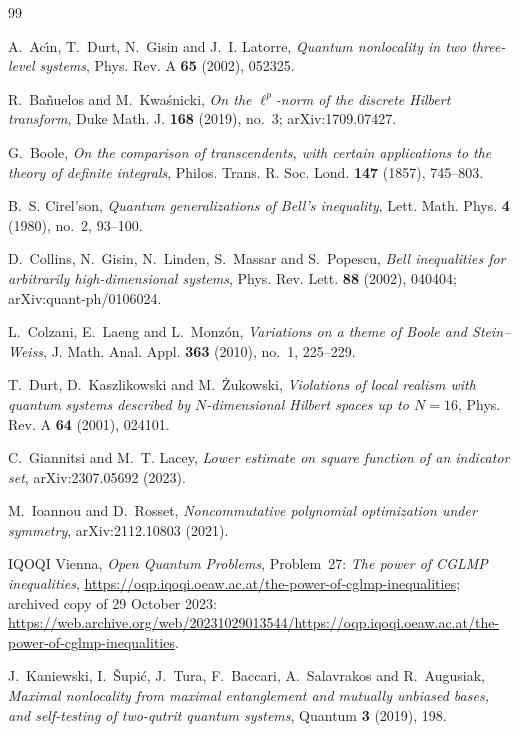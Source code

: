 \documentclass[11pt]{amsart}
\theoremstyle{definition}
\theoremstyle{remark}
\begin{document}
\begin{thebibliography}{99}

A.~Ac\'{\i}n, T.~Durt, N.~Gisin and J.~I. Latorre, \emph{Quantum nonlocality in two three-level systems},
Phys. Rev. A \textbf{65} (2002), 052325.

R.~Ba\~nuelos and M.~Kwa\'snicki, \emph{On the $\ell^p$-norm of the discrete Hilbert transform}, Duke Math. J.
\textbf{168} (2019), no.~3; arXiv:1709.07427.

G.~Boole, \emph{On the comparison of transcendents, with certain applications to the theory of definite
integrals}, Philos. Trans. R. Soc. Lond. \textbf{147} (1857), 745--803.

B.~S. Cirel'son, \emph{Quantum generalizations of Bell's inequality}, Lett. Math. Phys. \textbf{4} (1980), no.~2,
93--100.

D.~Collins, N.~Gisin, N.~Linden, S.~Massar and S.~Popescu, \emph{Bell inequalities for arbitrarily high-dimensional
systems}, Phys. Rev. Lett. \textbf{88} (2002), 040404; arXiv:quant-ph/0106024.

L.~Colzani, E.~Laeng and L.~Monz\'on, \emph{Variations on a theme of Boole and Stein--Weiss}, J. Math. Anal. Appl.
\textbf{363} (2010), no.~1, 225--229.

T.~Durt, D.~Kaszlikowski and M.~\.Zukowski, \emph{Violations of local realism with quantum systems described by
$N$-dimensional Hilbert spaces up to $N=16$}, Phys. Rev. A \textbf{64} (2001), 024101.

C.~Giannitsi and M.~T. Lacey, \emph{Lower estimate on square function of an indicator set}, arXiv:2307.05692 (2023).

M.~Ioannou and D.~Rosset, \emph{Noncommutative polynomial optimization under symmetry}, arXiv:2112.10803 (2021).

IQOQI Vienna, \emph{Open Quantum Problems}, Problem~27: \emph{The power of CGLMP inequalities},
\url{https://oqp.iqoqi.oeaw.ac.at/the-power-of-cglmp-inequalities}; archived copy of 29 October 2023:
\url{https://web.archive.org/web/20231029013544/https://oqp.iqoqi.oeaw.ac.at/the-power-of-cglmp-inequalities}.

J.~Kaniewski, I.~\v{S}upi\'c, J.~Tura, F.~Baccari, A.~Salavrakos and R.~Augusiak, \emph{Maximal nonlocality from
maximal entanglement and mutually unbiased bases, and self-testing of two-qutrit quantum systems}, Quantum
\textbf{3} (2019), 198.


\end{thebibliography}
\end{document}
